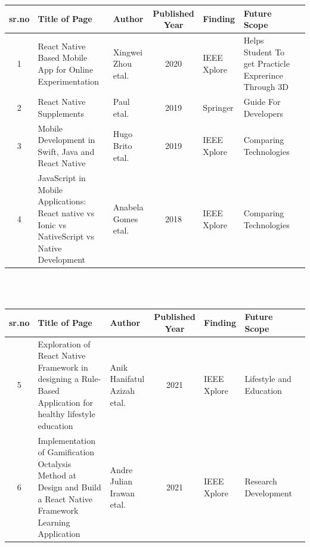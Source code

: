 \documentclass[12pt,a4paper]{report}
\begin{document}
\begin{tabular}{ |c | m{2.5cm} | m{2cm}| c | m{2cm} | m{2cm} | c | }

  \hline
  sr.no & Title of Page & Author & Published Year & Finding & Future Scope  \\ 
  \hline
  1 & React Native Based Mobile App for Online Experimentation & Xingwei Zhou etal. &  2020 & IEEE Xplore & Helps Student To  get Practicle Exprerince Through 3D \\
  \hline
  2 & React Native Supplements & Paul etal. &  2019 & Springer & Guide For Developers \\ 
\hline
    3 &  Mobile Development in Swift, Java and React Native & Hugo Brito etal. &  2019 & IEEE Xplore & Comparing Technologies \\
\hline 
 4 &  JavaScript in Mobile Applications: React native vs Ionic vs NativeScript vs Native Development & Anabela Gomes etal. &  2018 & IEEE Xplore & Comparing Technologies \\
\hline 

\end{tabular}
\\
\\

\newpage
\begin{tabular}{ |c | m{2.5cm} | m{2cm}| c | m{2cm} | m{2cm} | c | }

  \hline
  sr.no & Title of Page & Author & Published Year & Finding & Future Scope  \\ 
  \hline
 5 &  Exploration of React Native Framework in designing a Rule-Based Application for healthy lifestyle education & Anik Hanifatul Azizah etal. &  2021 & IEEE Xplore & Lifestyle and Education \\
\hline 

 6 &  Implementation of Gamification Octalysis Method at Design and Build a React Native Framework Learning Application & Andre Julian Irawan etal. &  2021 & IEEE Xplore & Research Development \\
\hline
\end{tabular}
\end{document}
